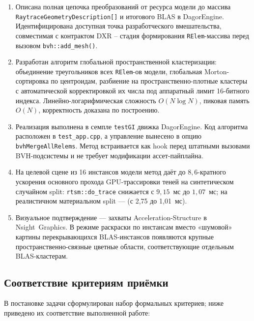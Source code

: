 \begin{enumerate}
    \item Описана полная цепочка преобразований
      от ресурса модели до массива \texttt{RaytraceGeometryDescription[]}
      и итогового BLAS в DagorEngine. Идентифицирована доступная точка
      разработческого вмешательства, совместимая с контрактом DXR --
      стадия формирования \texttt{RElem}-массива перед вызовом
      \texttt{bvh::add\_mesh()}.
    \item Разработан алгоритм глобальной пространственной кластеризации:
      объединение треугольников всех \texttt{RElem}-ов модели,
      глобальная Morton-сортировка по центроидам, разбиение на
      пространственно-плотные кластеры с автоматической
      корректировкой их числа под аппаратный лимит 16-битного
      индекса. Линейно-логарифмическая сложность $O(N\log N)$,
      пиковая память $O(N)$, корректность доказана по построению.
    \item Реализация выполнена в семпле \texttt{testGI} движка
      DagorEngine. Код алгоритма расположен в
      \texttt{test\_app.cpp}, а управление вынесено в опцию
      \texttt{bvhMergeAllRelems}. Метод встраивается как hook
      перед штатными вызовами BVH-подсистемы и не требует
      модификации ассет-пайплайна.
    \item На целевой сцене из 16 инстансов модели метод даёт до $8{,}6$-кратного ускорения основного
      прохода GPU-трассировки теней на синтетическом случайном split:
      \texttt{rtsm::do\_trace} снижается с $9{,}15$~мс до $1{,}07$~мс; на реалистичном материальном split ---
       (с 2,75 до 1,01~мс).
    \item Визуальное подтверждение --- захваты
      Acceleration-Structure в Nsight~Graphics. В режиме раскраски
      по инстансам вместо «шумовой» картины перекрывающихся
      BLAS-инстансов появляются крупные пространственно-связные
      цветные области, соответствующие отдельным BLAS-кластерам.
\end{enumerate}

\subsection{Соответствие критериям приёмки}

В постановке задачи сформулирован
набор формальных критериев; ниже приведено их соответствие выполненной работе:

